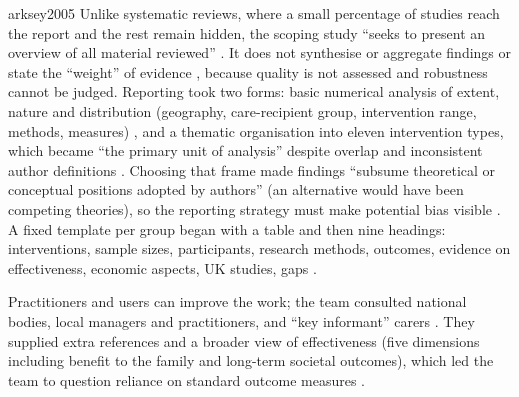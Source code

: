 \begin{papercard}{arksey2005}
 Unlike systematic reviews, where a small percentage of studies reach the report and the rest remain hidden, the scoping study ``seeks to present an overview of all material reviewed'' . It does not synthesise or aggregate findings or state the ``weight'' of evidence , because quality is not assessed and robustness cannot be judged. Reporting took two forms: basic numerical analysis of extent, nature and distribution (geography, care-recipient group, intervention range, methods, measures) , and a thematic organisation into eleven intervention types, which became ``the primary unit of analysis'' despite overlap and inconsistent author definitions . Choosing that frame made findings ``subsume theoretical or conceptual positions adopted by authors'' (an alternative would have been competing theories), so the reporting strategy must make potential bias visible . A fixed template per group began with a table and then nine headings: interventions, sample sizes, participants, research methods, outcomes, evidence on effectiveness, economic aspects, UK studies, gaps .

 Practitioners and users can improve the work; the team consulted national bodies, local managers and practitioners, and ``key informant'' carers . They supplied extra references and a broader view of effectiveness (five dimensions including benefit to the family and long-term societal outcomes), which led the team to question reliance on standard outcome measures .


\end{papercard}
